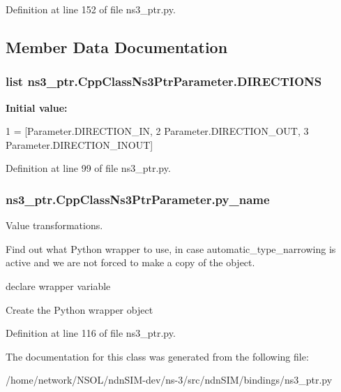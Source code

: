 Definition at line 152 of file ns3\+\_\+ptr.\+py.



\subsection{Member Data Documentation}
\subsubsection[{\texorpdfstring{D\+I\+R\+E\+C\+T\+I\+O\+NS}{DIRECTIONS}}]{\setlength{\rightskip}{0pt plus 5cm}list ns3\+\_\+ptr.\+Cpp\+Class\+Ns3\+Ptr\+Parameter.\+D\+I\+R\+E\+C\+T\+I\+O\+NS\hspace{0.3cm}{\ttfamily [static]}}\hypertarget{classns3__ptr_1_1CppClassNs3PtrParameter_abcdb53f91a90b6f7f1c5e48ec053faf9}{}\label{classns3__ptr_1_1CppClassNs3PtrParameter_abcdb53f91a90b6f7f1c5e48ec053faf9}
{\bfseries Initial value\+:}
\begin{DoxyCode}
1 = [Parameter.DIRECTION\_IN,
2                   Parameter.DIRECTION\_OUT,
3                   Parameter.DIRECTION\_INOUT]
\end{DoxyCode}


Definition at line 99 of file ns3\+\_\+ptr.\+py.

\subsubsection[{\texorpdfstring{py\+\_\+name}{py\_name}}]{\setlength{\rightskip}{0pt plus 5cm}ns3\+\_\+ptr.\+Cpp\+Class\+Ns3\+Ptr\+Parameter.\+py\+\_\+name}\hypertarget{classns3__ptr_1_1CppClassNs3PtrParameter_a89a3f5832da707413e4eeea4499b5e3a}{}\label{classns3__ptr_1_1CppClassNs3PtrParameter_a89a3f5832da707413e4eeea4499b5e3a}


Value transformations. 

Find out what Python wrapper to use, in case automatic\+\_\+type\+\_\+narrowing is active and we are not forced to make a copy of the object.

declare wrapper variable

Create the Python wrapper object 

Definition at line 116 of file ns3\+\_\+ptr.\+py.



The documentation for this class was generated from the following file\+:\begin{DoxyCompactItemize}
\item 
/home/network/\+N\+S\+O\+L/ndn\+S\+I\+M-\/dev/ns-\/3/src/ndn\+S\+I\+M/bindings/ns3\+\_\+ptr.\+py\end{DoxyCompactItemize}
